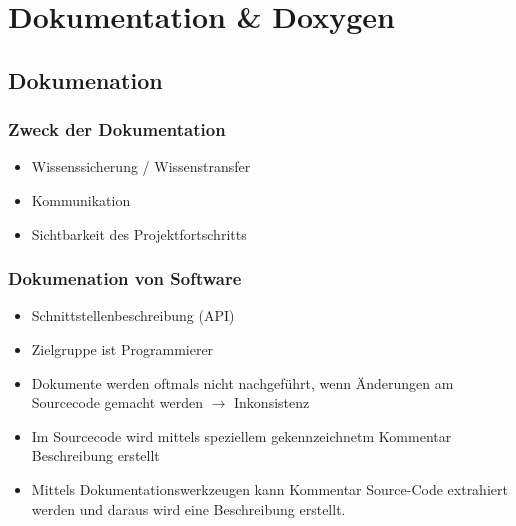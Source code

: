 \section{Dokumentation \& Doxygen}
\subsection{Dokumenation}
\subsubsection{Zweck der Dokumentation}
\begin{itemize}
	\item Wissenssicherung / Wissenstransfer
	\item Kommunikation
	\item Sichtbarkeit des Projektfortschritts
\end{itemize}
\subsubsection{Dokumenation von Software}
\begin{itemize}
	\item Schnittstellenbeschreibung (API)
	\item Zielgruppe ist Programmierer
	\item Dokumente werden oftmals nicht nachgeführt, wenn Änderungen am Sourcecode gemacht werden $\rightarrow$ Inkonsistenz
	\item Im Sourcecode wird mittels speziellem gekennzeichnetm Kommentar Beschreibung erstellt
	\item Mittels Dokumentationswerkzeugen kann Kommentar Source-Code extrahiert werden und daraus wird eine Beschreibung erstellt.  
\end{itemize}
